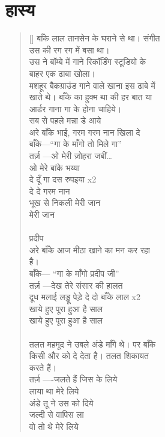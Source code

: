 \chapter{\texthindi{हास्य
}}

\begin{verse}[\versewidth]\texthindi{
बाँके लाल तानसेन के घराने से था। संगीत\\
उस की रग रग में बसा था।\\
उस ने बॉम्बे में गाने रिकॉर्डिंग स्टूडियो के\\
बाहर एक ढाबा खोला।\\
मशहूर बैकग्राउंड गाने वाले खाना इस ढाबे में\\
खाते थे। बाँके का हुक्म था की हर बात या\\
आर्डर गाना गा के होना चाहिये।\\
सब से पहले मन्ना डे आये\\
अरे बाँके भाई, गरम गरम नान खिला दे\\
बाँके—“गा के माँगो तो मिले गा”\\
तर्ज़ —ओ मेरी ज़ोहरा जबीं…\\
ओ मेरे बांके भय्या\\
दे दूँ गा दस रुपइया x2\\
दे दे गरम नान\\
भूख से निकली मेरी जान\\
मेरी जान\\
\\
प्रदीप\\
अरे बाँके आज मीठा खाने का मन कर रहा\\
है।\\
बाँके— “गा के माँगो प्रदीप जी”\\
तर्ज़ —देख तेरे संसार की हालत\\
दूध मलाई लड्डू पेड़े दे दो बाँके लाल x2\\
खाये हुए पूरा हुआ है साल\\
खाये हुए पूरा हुआ है साल\\
\\
तलत महमूद ने उबले अंडे माँगे थे। पर बाँके\\
किसी और को दे देता है। तलत शिकायत\\
करते हैं।\\
तर्ज़ —-जलते हैं जिस के लिये\\
लाया था मेरे लिये\\
अंडे तू ने उस को दिये\\
जल्दी से वापिस ला\\
वो तो थे मेरे लिये\\
}
\end{verse}
